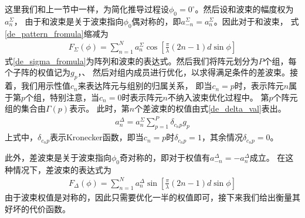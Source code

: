 \documentclass[master]{thesis-uestc}
\begin{document}
这里我们和上一节中一样，为简化推导过程设$\phi_0=0^\circ$。然后设和波束的幅度权为$a_n^\Sigma$，
由于和波束是关于波束指向$\phi_0$偶对称的，即$a_{-n}^{\Sigma}=a_{n}^{\Sigma}$。因此对于和波束，
式\eqref{de_pattern_fromula}缩减为
\begin{equation}\label{de_sigma_fromula}
    \begin{aligned}
        F_\Sigma(\phi) = 
        \sum_{n=1}^Na^\Sigma_{n}\cos\left[\frac{\pi}{\lambda}(2n-1)d\sin\phi\right]
    \end{aligned}
\end{equation}
式\eqref{de_sigma_fromula}为阵列和波束的表达式。然后我们将阵元划分为$P$个组，每个子阵的权值记为$g_p$，、
然后对组内成员进行优化，以求得满足条件的差波束。接着，我们用示性值$c_n$来表达阵元与组别的归属关系，
即当$c_n=p$时，表示阵元$n$属于第$p$个组，特别注意，当$c_n=0$时表示阵元$n$不纳入波束优化过程中。
第$p$个阵元组的集合由$\Gamma(p)$表示。
此时，第$n$个差波束的权值由式\eqref{de_delta_val}表出。
\begin{equation}\label{de_delta_val}
    \begin{aligned}
        a^\Delta_n = a^\Sigma_n\sum_{p=1}^{P}\delta_{c_np}g_p
    \end{aligned}
\end{equation}
上式中，$\delta_{c_np}$表示Kronecker函数，即当$c_n=p$时$\delta_{c_np}=1$，其余情况$\delta_{c_np}=0$。

此外，差波束是关于波束指向$\phi_0$奇对称的，即对于权值有$a^\Delta_{-n}=-a^\Delta_{n}$成立。
在这种情况下，差波束的表达式为
\begin{equation}
    \begin{aligned}
        F_\Delta(\phi) = 
        \sum_{n=1}^{N}a^\Delta_n\sin\left[\frac{\pi}{\lambda}(2n-1)d\sin\phi\right]
    \end{aligned}
\end{equation}
由于波束权值是对称的，因此只需要优化一半的权值即可，接下来我们给出衡量其好坏的代价函数。
\end{document}
